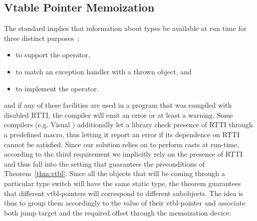 \subsection{Vtable Pointer Memoization}
\label{sec:vtblmem}


The \Cpp{} standard implies that information about types be available at run time 
for three distinct purposes~\cite[.1]{C++ABI}:

\begin{itemize}
\setlength{\itemsep}{0pt}
\setlength{\parskip}{0pt}
\item to support the  operator,
\item to match an exception handler with a thrown object, and
\item to implement the  operator.
\end{itemize}

\noindent
and if any of these facilities are used in a program that was compiled with 
disabled RTTI, the compiler will emit an error or at least a warning. Some 
compilers (e.g. Visual \Cpp{}) additionally let a library check presence of RTTI 
through a predefined macro, thus letting it report an error if its dependence on 
RTTI cannot be satisfied. Since our solution relies on  to 
perform casts at run-time, according to the third requirement we implicitly rely on the presence of RTTI and thus 
fall into the setting that guarantees the preconditions of Theorem~\ref{thm:vtbl}.
Since all the objects that will be coming through a particular type switch will 
have the same static type, the theorem guarantees that different vtbl-pointers 
will correspond to different subobjects. The idea is thus to group them 
accordingly to the value of their vtbl-pointer and associate both jump target 
and the required offset through the memoization device:

